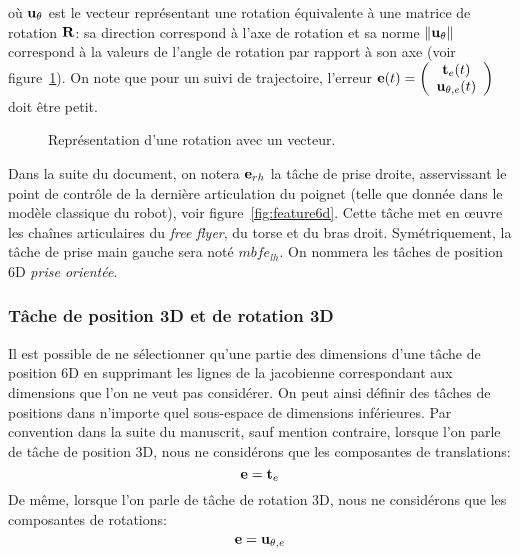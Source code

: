 \noindent où ${\mathbf{u}}_\theta$ est le vecteur représentant une rotation équivalente
à une matrice de rotation ${\mathbf{R}}$: sa direction correspond à l'axe de rotation
et sa norme $\Vert {\mathbf{u}}_\theta \Vert$ correspond à la valeurs de l'angle de rotation par rapport à son axe (voir figure~\ref{fig:utheta}).
On note que pour un suivi de trajectoire, l'erreur ${\mathbf{e}}(t)  = \left( \begin{array}{c} {\mathbf{t}}_e(t) \\ {\mathbf{u}}_{\theta, e}(t) \end{array} \right) $ doit être petit.
\begin{figure}[t]
  \begin{center}
    \resizebox{0.1\textwidth}{!}{
    
    }
  \end{center}
  \caption{Représentation d'une rotation avec un vecteur.}
  \label{fig:utheta}
\end{figure}

Dans la suite du document, on notera ${\mathbf{e}}_{rh}$ la t\^ache de prise droite,
asservissant le point de contrôle de la dernière articulation du poignet
(telle que donnée dans le modèle classique du robot), voir figure~\ref{fig:feature6d}.
Cette t\^ache met en \oe uvre les chaînes articulaires du \emph{free flyer}, du torse
et du bras droit. Symétriquement, la t\^ache de prise main gauche sera noté $mbf{e}_{lh}$.
On nommera les t\^aches de position 6D \emph{prise orientée}.

\subsubsection{T\^ache de position 3D et de rotation 3D}
Il est possible de ne sélectionner qu'une partie des dimensions 
d'une t\^ache de position 6D en supprimant les lignes de la jacobienne
correspondant aux dimensions que l'on ne veut pas considérer.
On peut ainsi définir des t\^aches de positions dans n'importe quel
sous-espace de dimensions inférieures.
Par convention dans la suite du manuscrit, sauf mention contraire, lorsque l'on parle de t\^ache de position 3D,
nous ne considérons que les composantes de translations: 
\begin{equation}
\mbf{e} = \mbf{t}_e
\label{eq:taskPosition}
\end{equation}
De même, lorsque l'on parle de t\^ache de rotation 3D,
   nous ne considérons que les composantes de rotations:
\begin{equation}
\mbf{e} = \mbf{u}_{\theta, e} 
\label{eq:taskRotation}
\end{equation}

